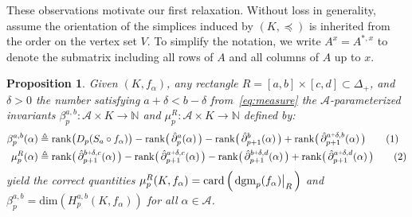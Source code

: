 \documentclass[10pt]{article}
\numberwithin{equation}{section}
\newcommand{\+}{%
	\raisebox{0.18ex}{\scaleobj{0.55}{+}}
}
\newcommand\restr[2]{{%
  \left.\kern-\nulldelimiterspace %
  #1 %
  \vphantom{\big|} %
  \right|_{#2} %
  }}
\newtheorem{proposition}{Proposition}
\theoremstyle{definition}
\theoremstyle{definition}
\newcommand\numberthis{\addtocounter{equation}{1}\tag{\theequation}}
\begin{document}

These observations motivate our first relaxation. Without loss in generality, assume the orientation of the simplices induced by $(K, \preceq)$ is inherited from the order on the vertex set $V$. To simplify the notation, we write $A^{x} = A^{\ast,x}$ to denote the submatrix including all rows of $A$ and all columns of $A$ up to $x$. 
\begin{proposition}\label{prop:mu_betti_1}
	Given $(K, f_\alpha)$, any rectangle $R = [a,b] \times [c,d] \subset \Delta_{+}$, and $\delta > 0$ the number satisfying $a + \delta < b - \delta$ from~\eqref{eq:measure}
	the $\mathcal{A}$-parameterized invariants $\beta_p^{a,b} : \mathcal{A} \times K \to \mathbb{N}$ and $\mu_p^{R} : \mathcal{A} \times K \to \mathbb{N}$ defined by: 
	\begin{align*}\label{eq:pbn_parameterized}
		\beta_p^{a,b}(\alpha) &\triangleq \mathrm{rank}\big(D_p(S_a \circ f_\alpha)\big) - \mathrm{rank}\big(\,\hat{\partial}_{p}^{a}(\alpha)\,\big) - \mathrm{rank}\big(\,\hat{\partial}_{p+1}^{b}(\alpha)\,\big) + \mathrm{rank}\big(\,\hat{\partial}_{p+1}^{a \+ \delta, b}(\alpha)\,\big) \numberthis \\
	\mu_p^{R}(\alpha) &\triangleq \mathrm{rank}\big(\, \hat{\partial}_{p+1}^{b \+ \delta, c}(\alpha)\,\big) - \mathrm{rank}\big(\, \hat{\partial}_{p+1}^{a \+ \delta, c}(\alpha)\,\big) - \mathrm{rank}\big(\, \hat{\partial}_{p+1}^{b \+ \delta, d}(\alpha)\,\big) + \mathrm{rank}\big(\, \hat{\partial}_{p+1}^{a \+ \delta, d}(\alpha)\,\big) \numberthis \label{eq:mu_parameterized}
	\end{align*}
	yield the correct quantities $\mu_p^R(K, f_\alpha) = \mathrm{card} \left( \, \restr{\mathrm{dgm}_p(f_\alpha)}{R} \, \right)$ and $\beta_p^{a,b} = \mathrm{dim}(H_p^{a,b}(K, f_\alpha))$ for all $\alpha \in \mathcal{A}$. 
\end{proposition}
\end{document}
